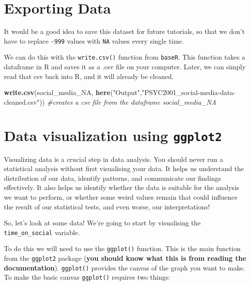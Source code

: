 \documentclass[
]{book}
\newenvironment{Shaded}{\begin{snugshade}}{\end{snugshade}}
\newcommand{\CommentTok}[1]{\textcolor[rgb]{0.56,0.35,0.01}{\textit{#1}}}
\newcommand{\FunctionTok}[1]{\textcolor[rgb]{0.13,0.29,0.53}{\textbf{#1}}}
\newcommand{\NormalTok}[1]{#1}
\newcommand{\StringTok}[1]{\textcolor[rgb]{0.31,0.60,0.02}{#1}}
\begin{document}
\section{Exporting Data}\label{exporting-data}

It would be a good idea to save this dataset for future tutorials, so that we don't have to replace \texttt{-999} values with \texttt{NA} values every single time.

We can do this with the \texttt{write.csv()} function from \texttt{baseR}. This function takes a dataframe in R and saves it as a .csv file on your computer. Later, we can simply read that csv back into R, and it will already be cleaned.

\begin{Shaded}
\begin{Highlighting}[]
\FunctionTok{write.csv}\NormalTok{(social\_media\_NA, }\FunctionTok{here}\NormalTok{(}\StringTok{"Output"}\NormalTok{,}\StringTok{"PSYC2001\_social{-}media{-}data{-}cleaned.csv"}\NormalTok{)) }\CommentTok{\#creates a csv file from the dataframe social\_media\_NA}
\end{Highlighting}
\end{Shaded}

\section{\texorpdfstring{Data visualization using \texttt{ggplot2}}{Data visualization using ggplot2}}\label{data-visualization-using-ggplot2}

Visualizing data is a crucial step in data analysis. You should never run a statistical analysis without first visualising your data. It helps us understand the distribution of our data, identify patterns, and communicate our findings effectively. It also helps us identify whether the data is suitable for the analysis we want to perform, or whether some weird values remain that could influence the result of our statistical tests, and even worse, our interpretations!

So, let's look at some data! We're going to start by visualising the \texttt{time\_on\_social} variable.

To do this we will need to use the \texttt{ggplot()} function. This is the main function from the \texttt{ggplot2} package (\textbf{you should know what this is from reading the documentation}). \texttt{ggplot()} provides the canvas of the graph you want to make.
To make the basic canvas \texttt{ggplot()} requires two things:
\end{document}
